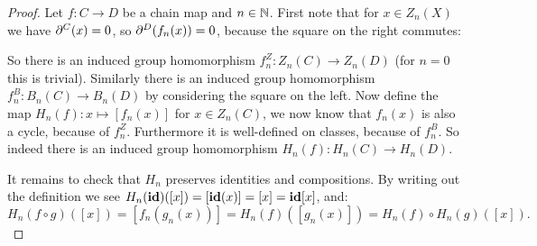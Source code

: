 \begin{proof}
	Let $f: C \to D$ be a chain map and $n \in \mathbb{N}$. First note that for $x \in Z_n(X)$ we have $\partial^C(x) = 0$, so $\partial^D(f_n(x)) = 0$, because the square on the right commutes:

	{\centering
	\par}

	So there is an induced group homomorphism $f^Z_n : Z_n(C) \to Z_n(D)$ (for $n=0$ this is trivial). Similarly there is an induced group homomorphism $f^B_n : B_n(C) \to B_n(D)$ by considering the square on the left. Now define the map $H_n(f) : x \mapsto [f_n(x)]$ for $x \in Z_n(C)$, we now know that $f_n(x)$ is also a cycle, because of $f^Z_n$. Furthermore it is well-defined on classes, because of $f^B_n$. So indeed there is an induced group homomorphism $H_n(f) : H_n(C) \to H_n(D)$.

	It remains to check that $H_n$ preserves identities and compositions. By writing out the definition we see $H_n(\mathbf{id})([x]) = [\mathbf{id}(x)] = [x] = \mathbf{id}[x]$, and:
	$$ H_n(f \circ g)([x]) = [f_n(g_n(x))] = H_n(f)([g_n(x)]) = H_n(f) \circ H_n(g) ([x]). $$
\end{proof}

